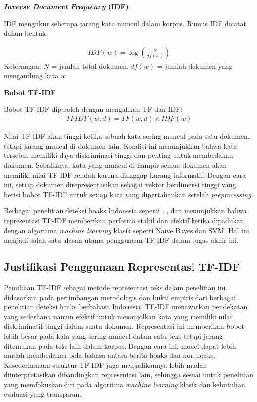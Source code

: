\textbf{\textit{Inverse Document Frequency} (IDF)}  

IDF mengukur seberapa jarang kata muncul dalam korpus. Rumus IDF dicatat dalam bentuk:

\begin{align}
IDF(w) = \log \left( \frac{N}{df(w)} \right) \label{eq=rumus-idf}
\end{align}
Keterangan:  
$N$ = jumlah total dokumen,  
$df(w)$ = jumlah dokumen yang mengandung kata $w$.

\textbf{Bobot TF-IDF}  

Bobot TF-IDF diperoleh dengan mengalikan TF dan IDF:
\begin{align}
TFIDF(w,d) = TF(w,d) \times IDF(w) \label{eq=rumus-tfidf}
\end{align}

Nilai TF-IDF akan tinggi ketika sebuah kata sering muncul pada satu dokumen, tetapi jarang muncul di dokumen lain. Kondisi ini menunjukkan bahwa kata tersebut memiliki daya diskriminasi tinggi dan penting untuk membedakan dokumen. Sebaliknya, kata yang muncul di hampir semua dokumen akan memiliki nilai TF-IDF rendah karena dianggap kurang informatif. Dengan cara ini, setiap dokumen direpresentasikan sebagai vektor berdimensi tinggi yang berisi bobot TF-IDF untuk setiap kata yang dipertahankan setelah \textit{preprocessing}.

Berbagai penelitian deteksi hoaks Indonesia seperti \textcite{prasetyo2019evaluation}, \textcite{pratiwi2022hoax}, dan \textcite{sihombing2020article} menunjukkan bahwa representasi TF-IDF memberikan performa stabil dan efektif ketika dipadukan dengan algoritma \textit{machine learning} klasik seperti Na\"{\i}ve Bayes dan SVM. Hal ini menjadi salah satu alasan utama penggunaan TF-IDF dalam tugas akhir ini.

\subsection{Justifikasi Penggunaan Representasi TF-IDF}

Pemilihan TF-IDF sebagai metode representasi teks dalam penelitian ini didasarkan pada pertimbangan metodologis dan bukti empiris dari berbagai penelitian deteksi hoaks berbahasa Indonesia. TF-IDF menawarkan pendekatan yang sederhana namun efektif untuk menonjolkan kata yang memiliki nilai diskriminatif tinggi dalam suatu dokumen. Representasi ini memberikan bobot lebih besar pada kata yang sering muncul dalam satu teks tetapi jarang ditemukan pada teks lain dalam korpus. Dengan cara ini, model dapat lebih mudah membedakan pola bahasa antara berita hoaks dan non-hoaks. Kesederhanaan struktur TF-IDF juga menjadikannya lebih mudah diinterpretasikan dibandingkan representasi lain, sehingga sesuai untuk penelitian yang memfokuskan diri pada algoritma \textit{machine learning} klasik dan kebutuhan evaluasi yang transparan.

